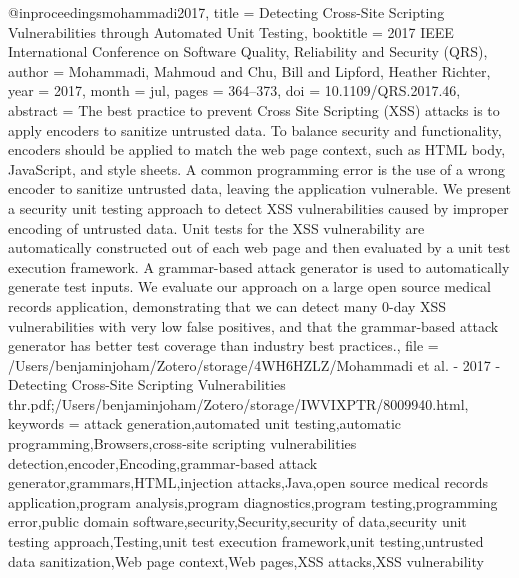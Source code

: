 @inproceedings{mohammadi2017,
  title = {Detecting {{Cross}}-{{Site Scripting Vulnerabilities}} through {{Automated Unit Testing}}},
  booktitle = {2017 {{IEEE International Conference}} on {{Software Quality}}, {{Reliability}} and {{Security}} ({{QRS}})},
  author = {Mohammadi, Mahmoud and Chu, Bill and Lipford, Heather Richter},
  year = {2017},
  month = jul,
  pages = {364--373},
  doi = {10.1109/QRS.2017.46},
  abstract = {The best practice to prevent Cross Site Scripting (XSS) attacks is to apply encoders to sanitize untrusted data. To balance security and functionality, encoders should be applied to match the web page context, such as HTML body, JavaScript, and style sheets. A common programming error is the use of a wrong encoder to sanitize untrusted data, leaving the application vulnerable. We present a security unit testing approach to detect XSS vulnerabilities caused by improper encoding of untrusted data. Unit tests for the XSS vulnerability are automatically constructed out of each web page and then evaluated by a unit test execution framework. A grammar-based attack generator is used to automatically generate test inputs. We evaluate our approach on a large open source medical records application, demonstrating that we can detect many 0-day XSS vulnerabilities with very low false positives, and that the grammar-based attack generator has better test coverage than industry best practices.},
  file = {/Users/benjaminjoham/Zotero/storage/4WH6HZLZ/Mohammadi et al. - 2017 - Detecting Cross-Site Scripting Vulnerabilities thr.pdf;/Users/benjaminjoham/Zotero/storage/IWVIXPTR/8009940.html},
  keywords = {attack generation,automated unit testing,automatic programming,Browsers,cross-site scripting vulnerabilities detection,encoder,Encoding,grammar-based attack generator,grammars,HTML,injection attacks,Java,open source medical records application,program analysis,program diagnostics,program testing,programming error,public domain software,security,Security,security of data,security unit testing approach,Testing,unit test execution framework,unit testing,untrusted data sanitization,Web page context,Web pages,XSS attacks,XSS vulnerability}
}

